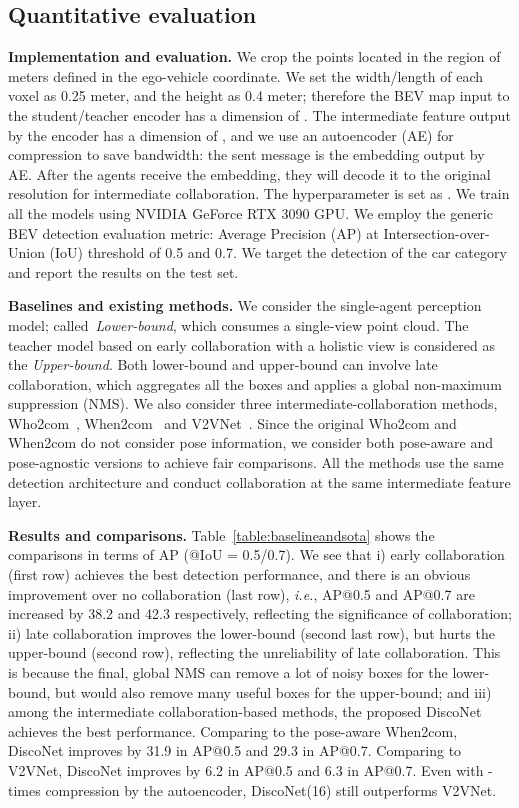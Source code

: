 \documentclass{article}
\begin{document}
\subsection{Quantitative evaluation}
\vspace{-3mm}
\textbf{Implementation and evaluation.}\label{subsec:implementation} We crop the points located in the region of  meters defined in the ego-vehicle  coordinate. We set the width/length of each voxel as 0.25 meter, and the height as 0.4 meter; therefore the BEV map input to the student/teacher encoder has a dimension of . The intermediate feature output by the encoder has a dimension of , and we use an autoencoder (AE) for compression to save bandwidth: the sent message is the embedding output by AE. After the agents receive the embedding, they will decode it to the original resolution   for intermediate collaboration. The hyperparameter  is set as . We train all the models using NVIDIA GeForce RTX 3090 GPU. We employ the generic BEV detection evaluation metric: Average Precision (AP) at Intersection-over-Union (IoU) threshold of 0.5 and 0.7. We target the detection of the car category and report the results on the test set.

\textbf{Baselines and existing methods.} We consider the single-agent perception model; called~\textit{Lower-bound}, which consumes a single-view point cloud. The teacher model based on early collaboration  with a holistic view is considered as the \textit{Upper-bound}. Both lower-bound and upper-bound can involve late collaboration, which aggregates all the boxes and applies a global non-maximum suppression (NMS).  We also consider three intermediate-collaboration methods, Who2com~\cite{liu2020who2com}, When2com~\cite{liu2020when2com} and V2VNet~\cite{wang2020v2vnet}.  Since the original Who2com and When2com do not consider pose information, we consider both pose-aware and pose-agnostic versions to achieve fair comparisons. All the methods use the same detection architecture and conduct collaboration at the same intermediate feature layer.

\textbf{Results and comparisons.} Table~\ref{table:baselineandsota} shows the  comparisons in terms of AP (@IoU = 0.5/0.7). We see that i) early collaboration (first row) achieves the best detection performance, and there is an obvious improvement over no collaboration (last row), \textit{i.e.}, AP@0.5 and AP@0.7 are increased by 38.2 and 42.3 respectively, reflecting the significance of collaboration; ii) late collaboration improves the lower-bound (second last row), but hurts the upper-bound (second row), reflecting the unreliability of late collaboration. This is because the final, global NMS can remove a lot of noisy boxes for the lower-bound, but would also remove many useful boxes for the upper-bound; and iii) among the intermediate collaboration-based methods, the proposed DiscoNet achieves the best performance. Comparing to the pose-aware When2com, DiscoNet improves by 31.9 in AP@0.5 and 29.3 in AP@0.7. Comparing to V2VNet, DiscoNet improves  by 6.2  in AP@0.5  and 6.3  in AP@0.7. Even with -times compression by the autoencoder, DiscoNet(16) still outperforms V2VNet.
\end{document}
